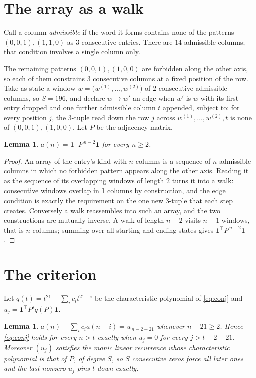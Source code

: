 \documentclass[11pt,a4paper]{article}
\theoremstyle{plain}
\newtheorem{lemma}[theorem]{Lemma}
\theoremstyle{definition}
\begin{document}
\section{The array as a walk}

Call a column \emph{admissible} if the word it forms contains none of the patterns
$(0,0,1), (1,1,0)$ as $3$ consecutive entries. There are $14$ admissible columns; that condition
involves a single column only.

The remaining patterns $(0,0,1), (1,0,0)$ are forbidden along the other axis, so each of them
constrains $3$ consecutive columns at a fixed position of the row. Take as state a
window $w=\bigl(w^{(1)},\dots,w^{(2)}\bigr)$ of $2$ consecutive admissible
columns, so $S=196$, and declare $w\to w'$ an edge when $w'$ is $w$ with its first entry
dropped and one further admissible column $t$ appended, subject to: for every position
$j$, the $3$-tuple read down the row $j$ across $w^{(1)},\dots,w^{(2)},t$
is none of $(0,0,1), (1,0,0)$. Let $P$ be the adjacency matrix.

\begin{lemma}\label{lem:walk}
$a(n)=\mathbf{1}^{\!\top}P^{\,n-2}\mathbf{1}$ for every $n\ge2$.
\end{lemma}

\begin{proof}
An array of the entry's kind with $n$ columns is a sequence of $n$ admissible columns in
which no forbidden pattern appears along the other axis. Reading it as the sequence of its
overlapping windows of length $2$ turns it into a walk: consecutive windows overlap in
$1$ columns by construction, and the edge condition is exactly the requirement on the one
new $3$-tuple that each step creates. Conversely a walk reassembles into such an array,
and the two constructions are mutually inverse. A walk of length $n-2$ visits $n-1$
windows, that is $n$ columns; summing over all starting and ending states gives
$\mathbf{1}^{\!\top}P^{\,n-2}\mathbf{1}$.
\end{proof}

\section{The criterion}

Let $q(t)=t^{21}-\sum_i c_i t^{21-i}$ be the characteristic polynomial of
\eqref{eq:conj} and $u_j=\mathbf{1}^{\!\top}P^{j}q(P)\mathbf{1}$.

\begin{lemma}\label{lem:crit}
$a(n)-\sum_i c_i a(n-i)=u_{\,n-2-21}$ whenever $n-21\ge2$. Hence
\eqref{eq:conj} holds for every $n>t$ exactly when $u_j=0$ for every
$j>t-2-21$. Moreover $(u_j)$ satisfies the monic linear recurrence whose
characteristic polynomial is that of $P$, of degree $S$, so $S$ consecutive zeros force all
later ones and the last nonzero $u_j$ pins $t$ down exactly.
\end{lemma}
\end{document}

